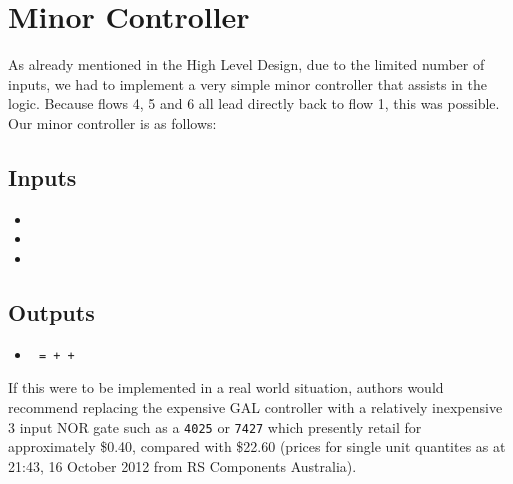 \section{Minor Controller}
As already mentioned in the High Level Design, due to the limited number of
inputs, we had to implement a very simple minor controller that assists in the
logic. Because flows 4, 5 and 6 all lead directly back to flow 1, this was
possible. Our minor controller is as follows:
\subsection{Inputs}
\begin{itemize}
  \item {}
  \item {}
  \item {}
\end{itemize}
\subsection{Outputs}
\begin{itemize}
  \item \texttt{ =  +  + }
\end{itemize}
If this were to be implemented in a real world situation, authors would
recommend replacing the expensive GAL controller with a relatively inexpensive
3 input NOR gate such as a \texttt{4025} or \texttt{7427} which presently retail
for approximately \$0.40, compared with \$22.60 (prices for single unit
quantites as at 21:43, 16 October 2012 from RS Components Australia).